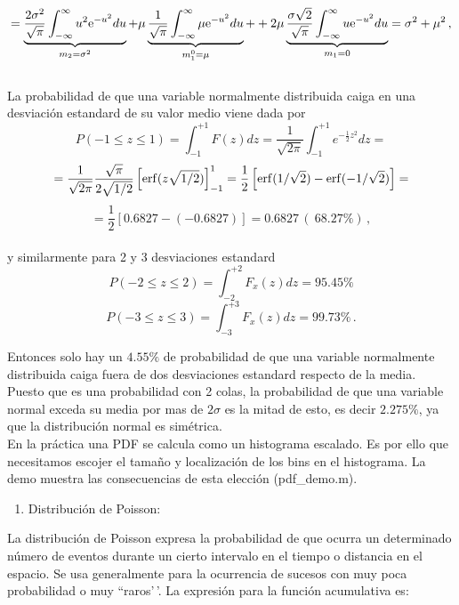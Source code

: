 \documentclass[
]{agujournal2019}
\providecommand{\tightlist}{%
  \setlength{\itemsep}{0pt}\setlength{\parskip}{0pt}}\usepackage{longtable,booktabs,array}
\begin{document}
\[
   =\underbrace{\frac{2\sigma^2}{\sqrt{\pi}}\int^{\infty}_{-\infty}u^2{\rm e}^{-u^2}du}_{m_2=\sigma^2}
   +\mu \underbrace{\frac{1}{\sqrt{\pi}}\int^{\infty}_{-\infty}\mu{\rm e}^{-u^2}du}_{m_1^0=\mu}+
   +2\mu \underbrace{\frac{\sigma\sqrt{2}}{\sqrt{\pi}}\int^{\infty}_{-\infty}u{\rm e}^{-u^2}du}_{m_1=0}= \sigma^2+\mu^2\,,\]\\

La probabilidad de que una variable normalmente distribuida caiga en una
desviación estandard de su valor medio viene dada por
\[P(-1\le z \le 1)=\int^{+1}_{-1} F(z) dz=\frac{1}{\sqrt{2\pi}}\int^{+1}_{-1}e^{-\frac{1}{2}z^2}dz=\]
\[=\frac{1}{\sqrt{2\pi}}\frac{\sqrt{\pi}}{2\sqrt{1/2}}\left[{\rm erf}({z\sqrt{1/2}})\right]^1_{-1}=
   \frac{1}{2}\left[{\rm erf}({1/\sqrt{2}})-{\rm erf}({-1/\sqrt{2}}) \right]=\]
\[=\frac{1}{2}\left[0.6827-(-0.6827)\right]=0.6827\,(~68.27\%)\,,\]\\

y similarmente para 2 y 3 desviaciones estandard\\

\[P(-2\le z \le 2)=\int^{+2}_{-2} F_x(z) dz=95.45\%\]
\[P(-3\le z \le 3)=\int^{+3}_{-3} F_x(z) dz=99.73\%\,.\]

Entonces solo hay un \(4.55\%\) de probabilidad de que una variable
normalmente distribuida caiga fuera de dos desviaciones estandard
respecto de la media. Puesto que es una probabilidad con 2 colas, la
probabilidad de que una variable normal exceda su media por mas de
\(2\sigma\) es la mitad de esto, es decir \(2.275\%\), ya que la
distribución normal es simétrica.\\
En la práctica una PDF se calcula como un histograma escalado. Es por
ello que necesitamos escojer el tamaño y localización de los bins en el
histograma. La demo muestra las consecuencias de esta elección
(pdf\_demo.m).

\begin{center}
\end{center}

\vspace{0.5cm}

\begin{enumerate}
\def\labelenumi{\arabic{enumi}.}
\setcounter{enumi}{2}
\tightlist
\item
  Distribución de Poisson:\\
\end{enumerate}

La distribución de Poisson expresa la probabilidad de que ocurra un
determinado número de eventos durante un cierto intervalo en el tiempo o
distancia en el espacio. Se usa generalmente para la ocurrencia de
sucesos con muy poca probabilidad o muy ``raros'\,'. La expresión para
la función acumulativa es:
\end{document}
